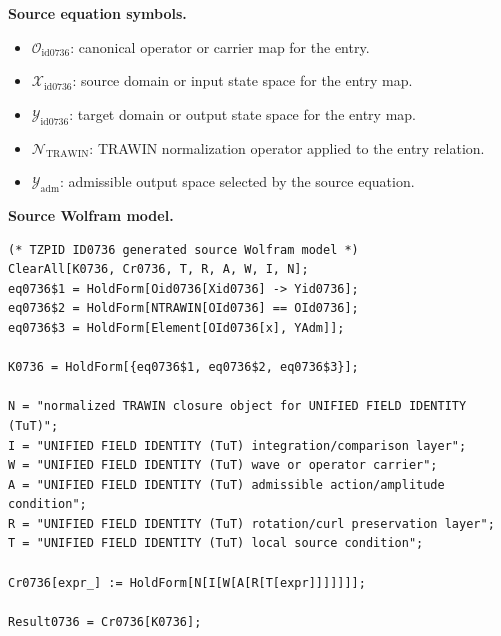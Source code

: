 \begin{minipage}[t]{0.49\linewidth}
\begingroup
\small
\raggedright
\textbf{Source equation symbols.}\par
\begin{itemize}[leftmargin=1.35em,itemsep=1pt,topsep=1pt,parsep=0pt]
    \item $\mathcal{O}_{\mathrm{id0736}}$: canonical operator or carrier map for the entry.
    \item $\mathcal{X}_{\mathrm{id0736}}$: source domain or input state space for the entry map.
    \item $\mathcal{Y}_{\mathrm{id0736}}$: target domain or output state space for the entry map.
    \item $\mathcal{N}_{\mathrm{TRAWIN}}$: TRAWIN normalization operator applied to the entry relation.
    \item $\mathcal{Y}_{\mathrm{adm}}$: admissible output space selected by the source equation.
\end{itemize}
\endgroup
\end{minipage}\hfill
\begin{minipage}[t]{0.47\linewidth}
\begingroup
\scriptsize
\raggedright
\textbf{Source Wolfram model.}\par
\begin{Verbatim}[fontsize=\tiny,breaklines=true,breakanywhere=true]
(* TZPID ID0736 generated source Wolfram model *)
ClearAll[K0736, Cr0736, T, R, A, W, I, N];
eq0736$1 = HoldForm[Oid0736[Xid0736] -> Yid0736];
eq0736$2 = HoldForm[NTRAWIN[OId0736] == OId0736];
eq0736$3 = HoldForm[Element[OId0736[x], YAdm]];

K0736 = HoldForm[{eq0736$1, eq0736$2, eq0736$3}];

N = "normalized TRAWIN closure object for UNIFIED FIELD IDENTITY (TuT)";
I = "UNIFIED FIELD IDENTITY (TuT) integration/comparison layer";
W = "UNIFIED FIELD IDENTITY (TuT) wave or operator carrier";
A = "UNIFIED FIELD IDENTITY (TuT) admissible action/amplitude condition";
R = "UNIFIED FIELD IDENTITY (TuT) rotation/curl preservation layer";
T = "UNIFIED FIELD IDENTITY (TuT) local source condition";

Cr0736[expr_] := HoldForm[N[I[W[A[R[T[expr]]]]]]];

Result0736 = Cr0736[K0736];
\end{Verbatim}
\endgroup
\end{minipage}

